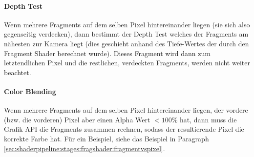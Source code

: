 \paragraph{Depth Test}
Wenn mehrere Fragments auf dem selben Pixel hintereinander liegen (sie sich also gegenseitig verdecken), dann bestimmt der Depth Test welches der Fragments am nähesten zur Kamera liegt (dies geschieht anhand des Tiefe-Wertes der durch den Fragment Shader berechnet wurde). Dieses Fragment wird dann zum letztendlichen Pixel und die restlichen, verdeckten Fragments, werden nicht weiter beachtet.

\paragraph{Color Blending}
Wenn mehrere Fragments auf dem selben Pixel hintereinander liegen, der vordere (bzw. die vorderen) Pixel aber einen Alpha Wert $< 100\%$ hat, dann muss die Grafik API die Fragments zusammen rechnen, sodass der resultierende Pixel die korrekte Farbe hat. Für ein Beispiel, siehe das Beispiel in Paragraph \ref{sec:shaderpipeline:stages:fragshader:fragmentvspixel}.
